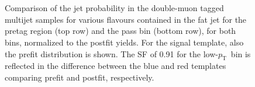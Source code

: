 \begin{figure}
\centering
 \\
 \\
\caption{Comparison of the jet probability in the double-muon tagged multijet samples for various flavours contained in the fat jet for the pretag region (top row) and the pass bin (bottom row), for both \pt bins, normalized to the postfit yields. For the signal template, also the prefit distribution is shown. The SF of 0.91 for the low-$p_\text{T}$~bin is reflected in the difference between the blue and red templates comparing prefit and postfit, respectively.}
\label{fig:double_shapes_norm}
\end{figure}


